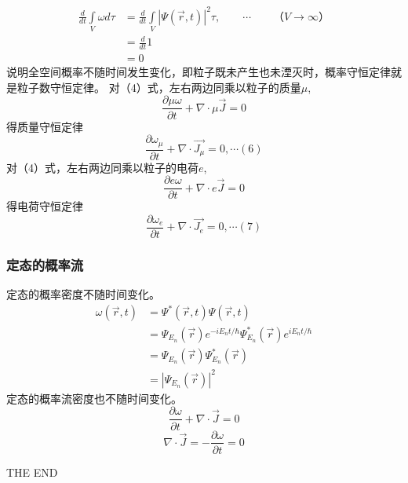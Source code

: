 \begin{frame} [allowframebreaks=]
    \begin{equation*}
        \begin{split}
        \frac{d}{d t} \int\limits_{V} \omega d \tau &= \frac{d}{d t} \int\limits_{V} |\Psi(\vec{r}, t)|^{2} \tau ,\qquad \cdots \qquad （V \to \infty）  \\
        &=\frac{d}{d t} 1\\ 
        &=0
        \end{split}
    \end{equation*}
    说明全空间概率不随时间发生变化，即粒子既未产生也未湮灭时，概率守恒定律就是粒子数守恒定律。
    对（4）式，左右两边同乘以粒子的质量$\mu$, 
    \begin{equation*}
        \frac{\partial \mu\omega}{\partial t}+ \nabla \cdot \mu\vec{J}=0
    \end{equation*}  
    得质量守恒定律
    \begin{equation*}
        \frac{\partial \omega_\mu}{\partial t}+ \nabla \cdot \vec{J_\mu}=0, \cdots (6)
    \end{equation*}  
    对（4）式，左右两边同乘以粒子的电荷$e$, 
    \begin{equation*}
        \frac{\partial e\omega}{\partial t}+ \nabla \cdot e\vec{J}=0
    \end{equation*}  
    得电荷守恒定律
    \begin{equation*}
        \frac{\partial \omega_e}{\partial t}+ \nabla \cdot \vec{J_e}=0, \cdots (7)
    \end{equation*}  
\end{frame}

\begin{frame} [allowframebreaks=]
    \frametitle{定态的概率流}
    定态的概率密度不随时间变化。
    \begin{equation*}
        \begin{split}
            \omega (\vec{r}, t)&=\Psi^{*}(\vec{r}, t) \Psi(\vec{r}, t) \\
            &=\Psi_{E_n} (\vec{r} ) e^{-iE_n t/\hbar} \Psi_{E_n} ^* (\vec{r} ) e^{iE_n t/\hbar} \\
            &=\Psi_{E_n} (\vec{r} )\Psi_{E_n} ^* (\vec{r} ) \\
            &=|\Psi_{E_n} (\vec{r} )|^2
        \end{split}
    \end{equation*}
    定态的概率流密度也不随时间变化。 
    \begin{equation*}
        \frac{\partial \omega}{\partial t }+ \nabla \cdot \vec{J}=0
    \end{equation*}  
    \to
    \begin{equation*}
        \nabla \cdot \vec{J}=-\frac{\partial \omega}{\partial t}=0
    \end{equation*}  
\end{frame}

\begin{frame}
    THE END
\end{frame}



